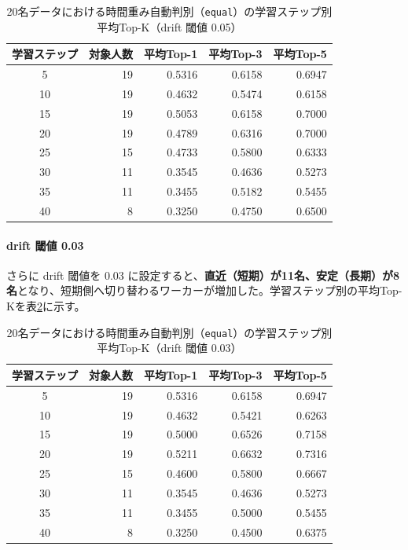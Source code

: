 \begin{table}[htbp]
\centering
\caption{20名データにおける時間重み自動判別（\texttt{equal}）の学習ステップ別平均Top-K（drift 閾値 0.05）}
\label{tab:time-auto-20workers-steps-thr005}
\scriptsize
\begin{tabular}{c r r r r}
\hline
学習ステップ & 対象人数 & 平均Top-1 & 平均Top-3 & 平均Top-5 \\
\hline
5  & 19 & 0.5316 & 0.6158 & 0.6947 \\
10 & 19 & 0.4632 & 0.5474 & 0.6158 \\
15 & 19 & 0.5053 & 0.6158 & 0.7000 \\
20 & 19 & 0.4789 & 0.6316 & 0.7000 \\
25 & 15 & 0.4733 & 0.5800 & 0.6333 \\
30 & 11 & 0.3545 & 0.4636 & 0.5273 \\
35 & 11 & 0.3455 & 0.5182 & 0.5455 \\
40 & 8  & 0.3250 & 0.4750 & 0.6500 \\
\hline
\end{tabular}
\end{table}

\paragraph{drift 閾値 0.03}
さらに drift 閾値を 0.03 に設定すると、\textbf{直近（短期）が11名、安定（長期）が8名}となり、短期側へ切り替わるワーカーが増加した。学習ステップ別の平均Top-Kを表\ref{tab:time-auto-20workers-steps-thr003}に示す。

\begin{table}[htbp]
\centering
\caption{20名データにおける時間重み自動判別（\texttt{equal}）の学習ステップ別平均Top-K（drift 閾値 0.03）}
\label{tab:time-auto-20workers-steps-thr003}
\scriptsize
\begin{tabular}{c r r r r}
\hline
学習ステップ & 対象人数 & 平均Top-1 & 平均Top-3 & 平均Top-5 \\
\hline
5  & 19 & 0.5316 & 0.6158 & 0.6947 \\
10 & 19 & 0.4632 & 0.5421 & 0.6263 \\
15 & 19 & 0.5000 & 0.6526 & 0.7158 \\
20 & 19 & 0.5211 & 0.6632 & 0.7316 \\
25 & 15 & 0.4600 & 0.5800 & 0.6667 \\
30 & 11 & 0.3545 & 0.4636 & 0.5273 \\
35 & 11 & 0.3455 & 0.5000 & 0.5455 \\
40 & 8  & 0.3250 & 0.4500 & 0.6375 \\
\hline
\end{tabular}
\end{table}
